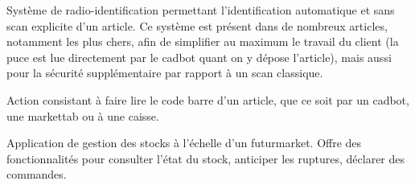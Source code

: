 Système de radio-identification permettant l'identification automatique et sans scan explicite d'un article.
Ce système est présent dans de nombreux articles, notamment les plus chers, afin de simplifier au maximum le travail du client (la puce est lue directement par le cadbot quant on y dépose l'article), mais aussi pour la sécurité supplémentaire par rapport à un scan classique.

Action consistant à faire lire le code barre d'un article, que ce soit par un cadbot, une markettab ou à une caisse.

Application de gestion des stocks à l'échelle d'un futurmarket.
Offre des fonctionnalités pour consulter l'état du stock, anticiper les ruptures, déclarer des commandes.
\par %
